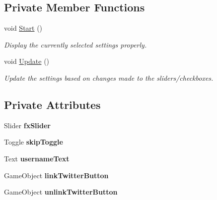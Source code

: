 \subsection*{Private Member Functions}
\begin{DoxyCompactItemize}
\item 
\mbox{\label{class_set_settings_a7d405e56dc6123768fac6fdd6e70ab0f}} 
void \mbox{\hyperlink{class_set_settings_a7d405e56dc6123768fac6fdd6e70ab0f}{Start}} ()
\begin{DoxyCompactList}\small\item\em Display the currently selected settings properly. \end{DoxyCompactList}\item 
\mbox{\label{class_set_settings_a73e6df43190f0b5494a4b66328fa9d12}} 
void \mbox{\hyperlink{class_set_settings_a73e6df43190f0b5494a4b66328fa9d12}{Update}} ()
\begin{DoxyCompactList}\small\item\em Update the settings based on changes made to the sliders/checkboxes. \end{DoxyCompactList}\end{DoxyCompactItemize}
\subsection*{Private Attributes}
\begin{DoxyCompactItemize}
\item 
\mbox{\label{class_set_settings_a22abfb2631badd1928606e7a15dbe310}} 
Slider {\bfseries fx\+Slider}
\item 
\mbox{\label{class_set_settings_a8d84aee5172cd4bc5ee79c4e3ed5b074}} 
Toggle {\bfseries skip\+Toggle}
\item 
\mbox{\label{class_set_settings_a153bac85520244c29722c46cd76eda14}} 
Text {\bfseries username\+Text}
\item 
\mbox{\label{class_set_settings_afedeb5ec6b9f344ada1f0cb254baffa2}} 
Game\+Object {\bfseries link\+Twitter\+Button}
\item 
\mbox{\label{class_set_settings_a2b44bdf91cd96346c509f960a569f366}} 
Game\+Object {\bfseries unlink\+Twitter\+Button}
\end{DoxyCompactItemize}


